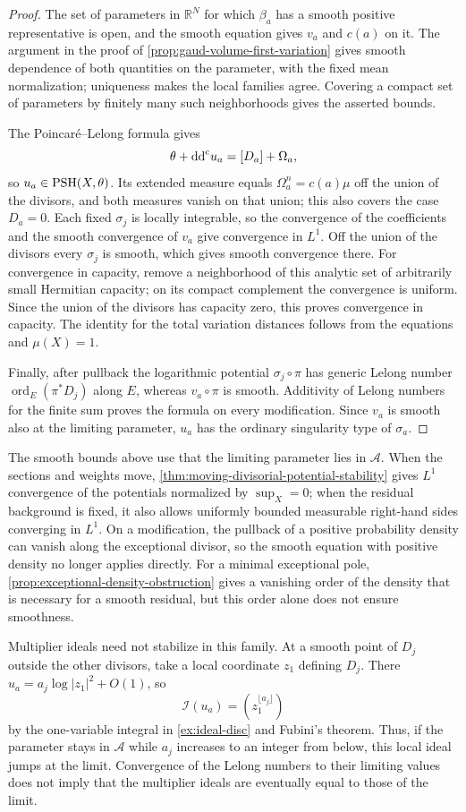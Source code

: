 \begin{proof}
The set of parameters in $\mathbb R^N$ for which $\beta_a$ has a smooth positive representative is open, and the smooth equation gives $v_a$ and $c(a)$ on it. The argument in the proof of \cref{prop:gaud-volume-first-variation} gives smooth dependence of both quantities on the parameter, with the fixed mean normalization; uniqueness makes the local families agree. Covering a compact set of parameters by finitely many such neighborhoods gives the asserted bounds.

The Poincar\'e--Lelong formula gives
\[
 \theta+\mathrm{dd}^{\mathrm{c}} u_a=[D_a]+\Omega_a,
\]
so $u_a\in\mathrm{PSH}(X,\theta)$. Its extended measure equals $\Omega_a^n=c(a)\mu$ off the union of the divisors, and both measures vanish on that union; this also covers the case $D_a=0$. Each fixed $\sigma_j$ is locally integrable, so the convergence of the coefficients and the smooth convergence of $v_a$ give convergence in $L^1$. Off the union of the divisors every $\sigma_j$ is smooth, which gives smooth convergence there. For convergence in capacity, remove a neighborhood of this analytic set of arbitrarily small Hermitian capacity; on its compact complement the convergence is uniform. Since the union of the divisors has capacity zero, this proves convergence in capacity. The identity for the total variation distances follows from the equations and $\mu(X)=1$.

Finally, after pullback the logarithmic potential $\sigma_j\circ\pi$ has generic Lelong number $\operatorname{ord}_E(\pi^*D_j)$ along $E$, whereas $v_a\circ\pi$ is smooth. Additivity of Lelong numbers for the finite sum proves the formula on every modification. Since $v_a$ is smooth also at the limiting parameter, $u_a$ has the ordinary singularity type of $\sigma_a$.
\end{proof}

The smooth bounds above use that the limiting parameter lies in $\mathcal A$. When the sections and weights move, \cref{thm:moving-divisorial-potential-stability} gives $L^1$ convergence of the potentials normalized by $\sup_X=0$; when the residual background is fixed, it also allows uniformly bounded measurable right-hand sides converging in $L^1$. On a modification, the pullback of a positive probability density can vanish along the exceptional divisor, so the smooth equation with positive density no longer applies directly. For a minimal exceptional pole, \cref{prop:exceptional-density-obstruction} gives a vanishing order of the density that is necessary for a smooth residual, but this order alone does not ensure smoothness.

Multiplier ideals need not stabilize in this family. At a smooth point of $D_j$ outside the other divisors, take a local coordinate $z_1$ defining $D_j$. There $u_a=a_j\log|z_1|^2+O(1)$, so
\[
 \mathcal I(u_a)=(z_1^{\lfloor a_j\rfloor})
\]
by the one-variable integral in \cref{ex:ideal-disc} and Fubini's theorem. Thus, if the parameter stays in $\mathcal A$ while $a_j$ increases to an integer from below, this local ideal jumps at the limit. Convergence of the Lelong numbers to their limiting values does not imply that the multiplier ideals are eventually equal to those of the limit.
